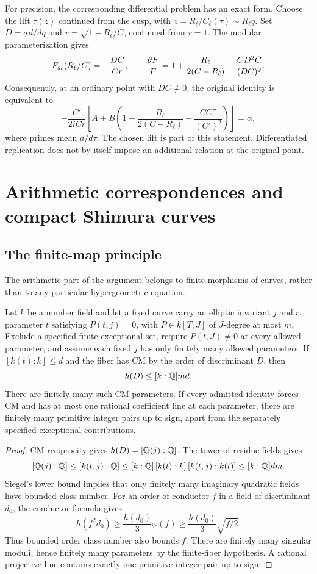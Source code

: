 For precision, the corresponding differential problem has an exact
form. Choose the lift $\tau(z)$ continued from the cusp, with
$z=R_\ell/C_\ell(\tau)\sim R_\ell q$. Set $D=q\,d/dq$ and
$r=\sqrt{1-R_\ell/C}$, continued from $r=1$. The modular
parameterization \cite[Theorem~2.1]{CCY} gives
\[
 F_{s_\ell}(R_\ell/C)=-\frac{DC}{Cr},\qquad
 \frac{\vartheta F}{F}
 =1+\frac{R_\ell}{2(C-R_\ell)}-\frac{CD^2C}{(DC)^2}.
\]
Consequently, at an ordinary point with $DC\ne0$, the original identity
is equivalent to
\begin{equation}\label{eq:moonshine-jet}
 -\frac{C'}{2iCr}
 \left[A+B\left(1+\frac{R_\ell}{2(C-R_\ell)}
                   -\frac{CC''}{(C')^2}\right)\right]=\alpha,
\end{equation}
where primes mean $d/d\tau$. The chosen lift is part of this statement.
Differentiated replication does not by itself impose an additional
relation at the original point.

\section{Arithmetic correspondences and compact Shimura curves}
\label{sec:extensions}
\subsection{The finite-map principle}

The arithmetic part of the argument belongs to finite morphisms of
curves, rather than to any particular hypergeometric equation.

\begin{proposition}
\label{prop:arithmetic-correspondence-packet}\label{prop:extension}
Let $k$ be a number field and let a fixed curve carry an elliptic
invariant $j$ and a parameter $t$ satisfying $P(t,j)=0$, with
$P\in k[T,J]$ of $J$-degree at most $m$. Exclude a specified finite
exceptional set, require $P(t,J)\ne0$ at every allowed parameter, and
assume each fixed $j$ has only finitely many allowed parameters.
If $[k(t):k]\le d$ and the fiber has CM by the order of discriminant
$D$, then
\[
 h(D)\le[k:\mathbb Q]md.
\]
There are finitely many such CM parameters. If every admitted identity
forces CM and has at most one rational coefficient line at each
parameter, there are finitely many primitive integer pairs up to sign,
apart from the separately specified exceptional contributions.
\end{proposition}
\begin{proof}
CM reciprocity gives $h(D)=[\mathbb Q(j):\mathbb Q]$. The tower of residue fields
gives
\[
 [\mathbb Q(j):\mathbb Q]\le[k(t,j):\mathbb Q]
 \le[k:\mathbb Q]\,[k(t):k]\,[k(t,j):k(t)]\le[k:\mathbb Q]dm.
\]
Siegel's lower bound implies that only finitely many imaginary
quadratic fields have bounded class number. For an order of conductor
$f$ in a field of discriminant $d_0$, the conductor formula gives
\[
 h(f^2d_0)\ge\frac{h(d_0)}3\varphi(f)
             \ge\frac{h(d_0)}3\sqrt{f/2}.
\]
Thus bounded order class number also bounds $f$. There are finitely
many singular moduli, hence finitely many parameters by the finite-fiber
hypothesis. A rational projective line contains exactly one primitive
integer pair up to sign.
\end{proof}


